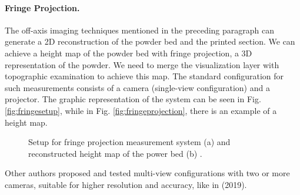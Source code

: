 \paragraph{Fringe Projection.} The off-axis imaging techniques mentioned in the preceding paragraph can generate a 2D reconstruction of the powder bed and the printed section. We can achieve a height map of the powder bed with fringe projection, a 3D representation of the powder. We need to merge the visualization layer with topographic examination to achieve this map. The standard configuration for such measurements consists of a camera (single-view configuration) and a projector. The graphic representation of the system can be seen in Fig. \ref{fig:fringesetup}, while in Fig. \ref{fig:fringeprojection}, there is an example of a height map.
\begin{figure}
    \centering
    \qquad
    \caption[Fringe projection.]{Setup for fringe projection measurement system (a) and reconstructed height map of the power bed (b) \cite{zhang_situ_2016}.}
\end{figure}
Other authors proposed and tested multi-view configurations with two or more cameras, suitable for higher resolution and accuracy, like in \citeauthor{kalms_new_2019} (2019).
